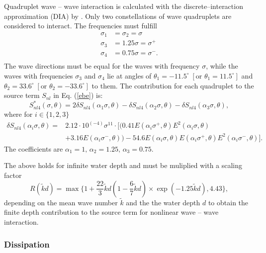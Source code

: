 Quadruplet wave -- wave interaction is calculated with the discrete--interaction approximation (DIA) by \citep[][]{hasselmann1985}. Only two constellations of wave quadruplets are considered to interact. The frequencies must fulfill
\begin{align*}
 \sigma_1 &= \sigma_2 = \sigma \\
 \sigma_3 &= 1.25 \sigma = \sigma^+ \\
 \sigma_4 &= 0.75 \sigma = \sigma^- .\\
\end{align*}
The wave directions must be equal for the waves with frequency $\sigma$, while the waves with frequencies $\sigma_3$ and $\sigma_4$ lie at angles of $\theta_1 = -11.5^\circ \; \left[ \text{or } \theta_1 = 11.5^\circ \right]$ and $\theta_2 = 33.6^\circ \; \left[ \text{or } \theta_2 = -33.6^\circ \right]$  to them. The contribution for each quadruplet to the source term $S_{nl}$ in Eq. (\ref{ebe}) is:
\begin{equation}
 S_{nl4}^\ast (\sigma, \theta) = 2 \delta S_{nl4} (\alpha_1 \sigma, \theta) - \delta S_{nl4} (\alpha_2 \sigma, \theta) - \delta S_{nl4} (\alpha_3 \sigma, \theta),
\end{equation}
where for $i \in \{1,2,3\}$
\begin{align*}
 \delta S_{nl4} ( \alpha_i \sigma, \theta ) = & 2.12 \cdot 10^{(-4)} \sigma^{11} \cdot [ ( 0.41 E(\alpha_i \sigma^+, \theta)E^2(\alpha_i \sigma, \theta) \\
 &+ 3.16 E(\alpha_i \sigma^-, \theta) ) - 54.6 E(\alpha_i \sigma, \theta) E(\alpha_i \sigma^+, \theta) E^2(\alpha_i \sigma^-, \theta) ] .
\end{align*}
The coefficients are $\alpha_1 = 1, \, \alpha_2 = 1.25, \, \alpha_3 = 0.75$. 

The above holds for infinite water depth and must be muliplied with a scaling factor 
\begin{equation}
 R ( \tilde{k}d ) = \max \{ 1+ \frac{22}{3}\tilde{k}d \left( 1-\frac{6}{7} \tilde{k}d \right) \times \exp(-1.25 \tilde{k}d) , 4.43 \} ,
\end{equation}
depending on the mean wave number $\tilde{k}$ and the the water depth $d$ to obtain the finite depth contribution to the source term for nonlinear wave -- wave interaction.

\subsubsection{Dissipation}

